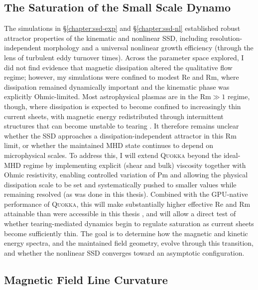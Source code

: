 \documentclass[12pt,twoside]{extreport}
\begin{document}
\subsection{The Saturation of the Small Scale Dynamo}

The simulations in \S\ref{chapter:ssd-exp} and \S\ref{chapter:ssd-nl} established robust attractor properties of the kinematic and nonlinear SSD, including resolution-independent morphology and a universal nonlinear growth efficiency (through the lens of turbulent eddy turnover times). Across the parameter space explored, I did not find evidence that magnetic dissipation altered the qualitative flow regime; however, my simulations were confined to modest $\mathrm{Re}$ and $\mathrm{Rm}$, where dissipation remained dynamically important and the kinematic phase was explicitly Ohmic-limited. Most astrophysical plasmas are in the $\mathrm{Rm} \gg 1$ regime, though, where dissipation is expected to become confined to increasingly thin current sheets, with magnetic energy redistributed through intermittent structures that can become unstable to tearing \citep{loureiro2017role, galishnikova2022tearing, beattie2025spectrum}. It therefore remains unclear whether the SSD approaches a dissipation-independent attractor in this $\mathrm{Rm}$ limit, or whether the maintained MHD state continues to depend on microphysical scales. To address this, I will extend \textsc{Quokka} beyond the ideal-MHD regime by implementing explicit (shear and bulk) viscosity together with Ohmic resistivity, enabling controlled variation of $\mathrm{Pm}$ and allowing the physical dissipation scale to be set and systematically pushed to smaller values while remaining resolved (as was done in this thesis). Combined with the GPU-native performance of \textsc{Quokka}, this will make substantially higher effective $\mathrm{Re}$ and $\mathrm{Rm}$ attainable than were accessible in this thesis \citep{ji2022magnetic}, and will allow a direct test of whether tearing-mediated dynamics begin to regulate saturation as current sheets become sufficiently thin. The goal is to determine how the magnetic and kinetic energy spectra, and the maintained field geometry, evolve through this transition, and whether the nonlinear SSD converges toward an asymptotic configuration.

\subsection{Magnetic Field Line Curvature}
\end{document}
